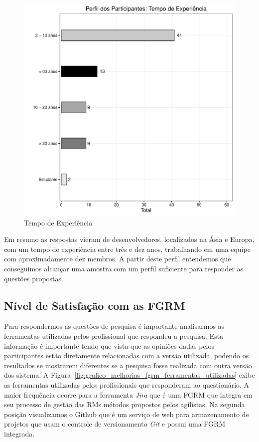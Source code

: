 \begin{figure}[htpb]
	\centering
	\includegraphics[width=0.8\linewidth]{./chapter-pesquisa-com-profissionais/img/grafico_melhorias_fgrm_tempo_experiencia.pdf}
	\caption{Tempo de Experiência}
\label{fig:grafico_melhorias_fgrm_tempo_experiencia}
\end{figure}

Em resumo as respostas vieram de desenvolvedores, localizados na Ásia e Europa,
com um tempo de experiência entre três e dez anos, trabalhando em uma equipe com
aproximadamente dez membros. A partir deste perfil entendemos que conseguimos
alcançar uma amostra com um perfil suficiente para responder as questões
propostas.

\subsection{Nível de Satisfação com as FGRM}
\label{sub:nivel_de_satisfação_com_as_fgrm}

Para respondermos as questões de pesquisa é importante analisarmos as
ferramentas utilizadas pelos profissional que respondeu a pesquisa. Esta
informação é importante tendo que vista que as opiniões dadas pelos
participantes estão diretamente relacionadas com a versão utilizada, podendo os
resultados se mostrarem diferentes se a pesquisa fosse realizada com outra
versão dos sistema.  A
Figura~\ref{fig:grafico_melhorias_fgrm_ferramentas_utilizadas} exibe as
ferramentas utilizadas pelos profissionais que responderam ao questionário. A
maior frequência ocorre para a ferramenta \textit{Jira} que é uma FGRM que
integra em seu processo de gestão das RMs métodos propostos pelos agilistas. Na
segunda posição visualizamos o Github que é um serviço de web para armazenamento
de projetos que usam o controle de versionamento \textit{Git} e possui uma FGRM
integrada.

